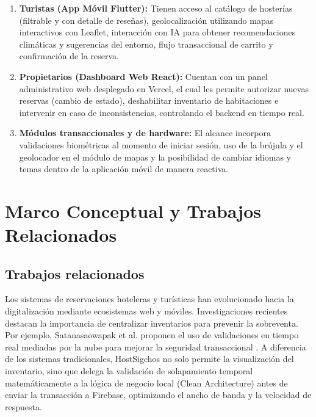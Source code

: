 \documentclass[12pt,letterpaper]{report}
\begin{document}
\begin{enumerate}
    \item \textbf{Turistas (App Móvil Flutter):} Tienen acceso al catálogo de hosterías (filtrable y con detalle de reseñas), geolocalización utilizando mapas interactivos con Leaflet, interacción con IA para obtener recomendaciones climáticas y sugerencias del entorno, flujo transaccional de carrito y confirmación de la reserva.
    \item \textbf{Propietarios (Dashboard Web React):} Cuentan con un panel administrativo web desplegado en Vercel, el cual les permite autorizar nuevas reservas (cambio de estado), deshabilitar inventario de habitaciones e intervenir en caso de inconsistencias, controlando el backend en tiempo real.
    \item \textbf{Módulos transaccionales y de hardware:} El alcance incorpora validaciones biométricas al momento de iniciar sesión, uso de la brújula y el geolocador en el módulo de mapas y la posibilidad de cambiar idiomas y temas dentro de la aplicación móvil de manera reactiva.
\end{enumerate}

\chapter{Marco Conceptual y Trabajos Relacionados}

\section{Trabajos relacionados}
Los sistemas de reservaciones hoteleras y turísticas han evolucionado hacia la digitalización mediante ecosistemas web y móviles. Investigaciones recientes destacan la importancia de centralizar inventarios para prevenir la sobreventa. Por ejemplo, Satanasaowapak et al. proponen el uso de validaciones en tiempo real mediadas por la nube para mejorar la seguridad transaccional \cite{satanasaowapak2021qr}. 
A diferencia de los sistemas tradicionales, HostSigchos no solo permite la visualización del inventario, sino que delega la validación de solapamiento temporal matemáticamente a la lógica de negocio local (Clean Architecture) antes de enviar la transacción a Firebase, optimizando el ancho de banda y la velocidad de respuesta.
\end{document}
